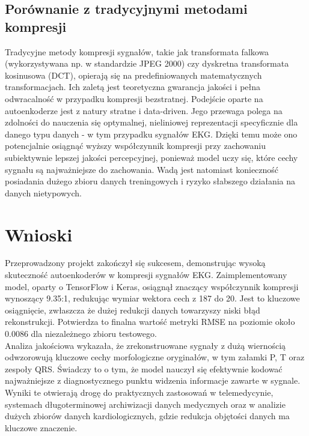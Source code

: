 \documentclass[12pt,a4paper]{article}
\begin{document}
\subsection{Porównanie z tradycyjnymi metodami kompresji}

Tradycyjne metody kompresji sygnałów, takie jak transformata falkowa (wykorzystywana np. w standardzie JPEG 2000) czy dyskretna transformata kosinusowa (DCT), opierają się na predefiniowanych matematycznych transformacjach. Ich zaletą jest teoretyczna gwarancja jakości i pełna odwracalność w przypadku kompresji bezstratnej. Podejście oparte na autoenkoderze jest z natury stratne i data-driven. Jego przewaga polega na zdolności do nauczenia się optymalnej, nieliniowej reprezentacji specyficznie dla danego typu danych - w tym przypadku sygnałów EKG. Dzięki temu może ono potencjalnie osiągnąć wyższy współczynnik kompresji przy zachowaniu subiektywnie lepszej jakości percepcyjnej, ponieważ model uczy się, które cechy sygnału są najważniejsze do zachowania. Wadą jest natomiast konieczność posiadania dużego zbioru danych treningowych i ryzyko słabszego działania na danych nietypowych.

\section{Wnioski}

Przeprowadzony projekt zakończył się sukcesem, demonstrując wysoką skuteczność autoenkoderów w kompresji sygnałów EKG. Zaimplementowany model, oparty o TensorFlow i Keras, osiągnął znaczący współczynnik kompresji wynoszący 9.35:1, redukując wymiar wektora cech z 187 do 20. Jest to kluczowe osiągnięcie, zwłaszcza że dużej redukcji danych towarzyszy niski błąd rekonstrukcji. Potwierdza to finalna wartość metryki RMSE na poziomie około 0.0086 dla niezależnego zbioru testowego. \\

Analiza jakościowa wykazała, że zrekonstruowane sygnały z dużą wiernością odwzorowują kluczowe cechy morfologiczne oryginałów, w tym załamki P, T oraz zespoły QRS. Świadczy to o tym, że model nauczył się efektywnie kodować najważniejsze z diagnostycznego punktu widzenia informacje zawarte w sygnale. Wyniki te otwierają drogę do praktycznych zastosowań w telemedycynie, systemach długoterminowej archiwizacji danych medycznych oraz w analizie dużych zbiorów danych kardiologicznych, gdzie redukcja objętości danych ma kluczowe znaczenie. \\
\end{document}

